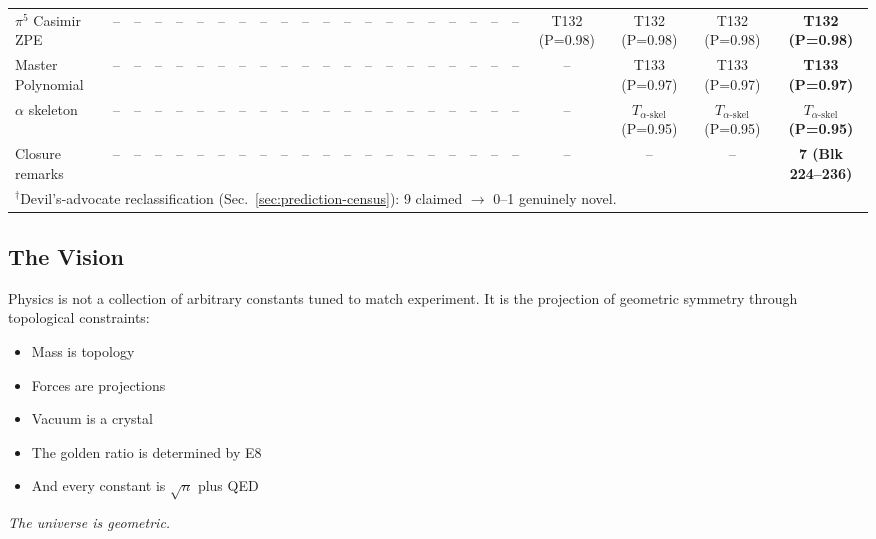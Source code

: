 \documentclass[aps,prd,twocolumn,superscriptaddress,floatfix,nofootinbib]{revtex4-2}
\theoremstyle{definition}
\theoremstyle{remark}
\begin{document}
\begin{center}
\begin{tabular}{lcccccccccccccccccccccccc}
$\pi^5$ Casimir ZPE & -- & -- & -- & -- & -- & -- & -- & -- & -- & -- & -- & -- & -- & -- & -- & -- & -- & -- & -- & -- & T132 (P{=}0.98) & T132 (P{=}0.98) & T132 (P{=}0.98) & \textbf{T132 (P{=}0.98)} \\
Master Polynomial & -- & -- & -- & -- & -- & -- & -- & -- & -- & -- & -- & -- & -- & -- & -- & -- & -- & -- & -- & -- & -- & T133 (P{=}0.97) & T133 (P{=}0.97) & \textbf{T133 (P{=}0.97)} \\
$\alpha$ skeleton & -- & -- & -- & -- & -- & -- & -- & -- & -- & -- & -- & -- & -- & -- & -- & -- & -- & -- & -- & -- & -- & $T_{\alpha\text{-skel}}$ (P{=}0.95) & $T_{\alpha\text{-skel}}$ (P{=}0.95) & \textbf{$T_{\alpha\text{-skel}}$ (P{=}0.95)} \\
Closure remarks & -- & -- & -- & -- & -- & -- & -- & -- & -- & -- & -- & -- & -- & -- & -- & -- & -- & -- & -- & -- & -- & -- & -- & \textbf{7 (Blk 224--236)} \\
\bottomrule
\multicolumn{25}{l}{\footnotesize $^\dagger$Devil's-advocate reclassification (Sec.~\ref{sec:prediction-census}): 9 claimed $\to$ 0--1 genuinely novel.}
\end{tabular}
\end{center}

\subsection{The Vision}

Physics is not a collection of arbitrary constants tuned to match experiment. It is the projection of geometric symmetry through topological constraints:

\begin{itemize}
\item Mass is topology
\item Forces are projections
\item Vacuum is a crystal
\item The golden ratio is determined by E8
\item And every constant is $\sqrt{n}$ plus QED
\end{itemize}

\textit{The universe is geometric.}
\end{document}

